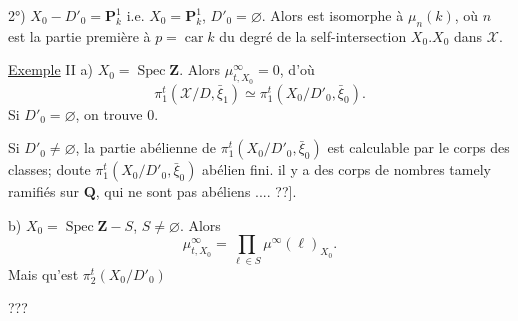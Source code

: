 2°) $\boxed{X_0-D'_0=\mathbf{P}^1_k}$ i.e. $X_0=\mathbf{P}^1_k$, $D'_0=\varnothing$. Alors  est  isomorphe à $\mu_n(k)$, où $n$ est la partie première à $p=\operatorname{car}k$ du degré de la self-intersection $X_0.X_0$ dans $\mathcal{X}$.

\uline{Exemple} II a) $X_0=\operatorname{Spec}\mathbf{Z}$. Alors $\mu_{t,X_0}^\infty=0$,
d'où
\[
\pi_1^t(\mathcal{X}/D,\bar\xi_1)\simeq\pi_1^t(X_0/D'_0,\bar\xi_0).
\]
 Si $D'_0=\varnothing$, on trouve $0$.

Si $D'_0\ne\varnothing$, la partie abélienne de $\pi_1^t(X_0/D'_0,\bar\xi_0)$ est calculable par le corps des classes;  doute $\pi_1^t(X_0/D'_0,\bar\xi_0)$   abélien fini. il y a des  corps de nombres tamely ramifiés sur $\mathbf{Q}$, qui ne sont pas abéliens .... ??].

b) $X_0=\operatorname{Spec}\mathbf{Z}-S$, $S\ne\varnothing$. Alors
\[
\mu_{t,X_0}^\infty=\prod_{\ell\in S}\mu^\infty(\ell)_{X_0}.
\]
Mais qu'est $\pi_2^t(X_0/D'_0)$

???
